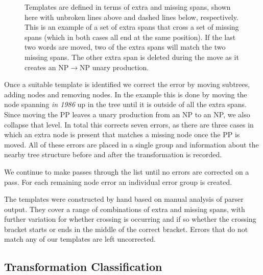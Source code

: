 \begin{figure}
\begin{center}
\end{center}
\caption{
	\label{fig:template}
	Templates are defined in terms of extra and missing spans, shown here with
	unbroken lines above and dashed lines below, respectively.  This is an
	example of a set of extra spans that cross a set of missing spans (which in
	both cases all end at the same position).  If the last two words are moved,
	two of the extra spans will match the two missing spans.  The other extra
	span is deleted during the move as it creates an NP$\rightarrow$NP unary
	production.
}
\end{figure}

Once a suitable template is identified we correct the error by moving subtrees,
adding nodes and removing nodes.  In the example this is done by moving the
node spanning \emph{in 1986} up in the tree until it is outside of all the
extra spans.  Since moving the PP leaves a unary production from an NP to an
NP, we also collapse that level.  In total this corrects seven errors, as there
are three cases in which an extra node is present that matches a missing node
once the PP is moved.  All of these errors are placed in a single group and
information about the nearby tree structure before and after the transformation
is recorded.

We continue to make passes through the list until no errors are corrected on a
pass.  For each remaining node error an individual error group is created.

The templates were constructed by hand based on manual analysis of parser
output.  They cover a range of combinations of extra and missing spans, with
further variation for whether crossing is occurring and if so whether the
crossing bracket starts or ends in the middle of the correct bracket.
Errors that do not match any of our templates are left uncorrected.

\subsection{Transformation Classification}

